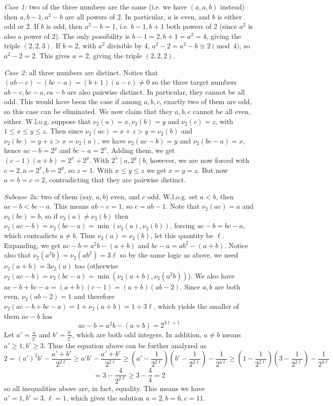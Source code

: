 \documentclass[11pt,a4paper]{article}
\begin{document}
\begin{enumerate}
\emph{Case 1:} two of the three numbers are the same (i.e. we have $(a, a, b)$ instead) then $a, b - 1, a^2-b$ are all powers of 2.
In particular, $a$ is even, and $b$ is either odd or 2. 
If $b$ is odd, then $a^2-b = 1$, i.e. $b-1, b+1$ both powers of 2 (since $a^2$ is also a power of 2). 
The only possibility is $b-1=2, b+1=a^2=4$, giving the triple $(2, 2, 3)$. 
If $b=2$, with $a^2$ divisible by 4, $a^2-2=a^2-b\equiv 2\pmod{4}$, so $a^2-2=2$. This gives $a=2$, giving the triple $(2, 2, 2)$. 

\emph{Case 2:} all three numbers are distinct. 
Notice that $(ab-c)-(bc-a) = (b + 1)(a - c)\neq 0$ so the three target numbers $ab-c, bc-a, ca-b$ are also pairwise distinct. 
In particular, they cannot be all odd. This would have been the case if among $a, b, c$, exactly two of them are odd, 
so this case can be eliminated. 
We now claim that they $a, b, c$ cannot be all even, either. 
W.l.o.g. suppose that $\nu_2(a)=x, \nu_2(b)=y$ and $\nu_2(c)=z$, 
with $1\le x\le y\le z$. 
Then since $\nu_2(ac) = x + z > y=\nu_2(b)$ and 
$\nu_2(bc)=y+z > x =  \nu_2(a)$, 
we have $\nu_2(ac- b) = y$ and $\nu_2(bc - a)=x$, 
hence $ac-b=2^y$ and $bc-a=2^x$. 
Adding them, we get $(c-1)(a+b)=2^x+2^y$. 
With $2^x\mid a, 2^y\mid b$, however, we are now forced with $c=2, a=2^x, b=2^y$, 
so $z=1$. With $x\le y\le z$ we get $x=y=z$. But now $a=b=c=2$, contradicting that they are pairwise distinct. 

\emph{Subcase 2a:}  two of them (say, $a, b$) even, and $c$ odd. 
W.l.o.g. set $a < b$, then $ac-b < bc - a$. 
This means $ab-c=1$, so $c=ab-1$. 
Note that $\nu_2(ac)=a$ and $\nu_2(bc)=b$, so if $\nu_2(a)\neq\nu_2(b)$ then 
$\nu_2(ac-b)=\nu_2(bc-a)=\min(\nu_2(a), \nu_2(b))$, forcing $ac-b=bc-a$, which contradicts $a\neq b$. 
Thus $\nu_2(a)=\nu_2(b)$, let this quantity be $\ell$. Expanding, 
we get $ac-b=a^2b - (a + b)$ and $bc-a=ab^2- (a + b)$. 
Notice also that $\nu_2(a^2b)=\nu_2(ab^2)=3\ell$ so by the same logic as above, we need $\nu_2(a + b)=3\nu_2(a)$ too 
(otherwise $\nu_2(ac-b)=\nu_2(bc-a)=\min(\nu_2(a+b), \nu_2(a^2b))$). 
We also have $ac-b+bc-a=(a+b)(c-1)=(a+b)(ab-2)$. 
Since $a, b$ are both even, $\nu_2(ab-2)=1$ and therefore 
$\nu_2(ac-b+bc-a)
=1+\nu_2(a+b)=1+3\ell$, which yields the smaller of them $ac - b$ has 
\[ac - b = a^2b - (a + b) = 2^{3\ell+1}\]
Let $a'=\frac{a}{2^{\ell}}$ and $b'=\frac{b'}{2^{\ell}}$, which are both odd integers. 
In addition, $a\neq b$ means $a'\ge 1, b'\ge 3$. 
Thus the equation above can be further analyzed as 
\[
2
=(a')^2b' - \frac{a'+b'}{2^{2\ell}}
\ge a'b' - \frac{a'+b'}{2^{2\ell}}
\ge (a' - \frac{1}{2^{2\ell}})(b' - \frac{1}{2^{2\ell}}) - \frac{1}{2^{4\ell}}
\ge (1 - \frac{1}{2^{2\ell}})(3 - \frac{1}{2^{2\ell}}) - \frac{1}{2^{4\ell}}
\]
\[
=3 - \frac{4}{2^{2\ell}}
\ge 3 - \frac 4 4
=2
\]
so all inequalities above are, in fact, equality. This means we have $a'=1, b'=3, \ell=1$, which gives the solution $a=2, b=6, c=11$. 


\end{enumerate}
\end{document}
